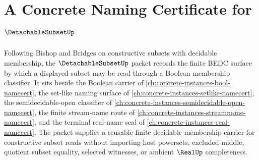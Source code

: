 \chapter{A Concrete Naming Certificate for $\DetachableSubsetUp$}
\label{ch:concrete-instances-detachable-subset-namecert}

Following Bishop and Bridges on constructive subsets with decidable membership, the $\DetachableSubsetUp$ packet records the finite BEDC surface by which a displayed subset may be read through a Boolean membership classifier. It sits beside the Boolean carrier of \autoref{ch:concrete-instances-bool-namecert}, the set-like naming surface of \autoref{ch:concrete-instances-setlike-namecert}, the semidecidable-open classifier of \autoref{ch:concrete-instances-semidecidable-open-namecert}, the finite stream-name route of \autoref{ch:concrete-instances-streamname-namecert}, and the terminal real-name seal of \autoref{ch:concrete-instances-real-namecert}. The packet supplies a reusable finite decidable-membership carrier for constructive subset reads without importing host powersets, excluded middle, quotient subset equality, selected witnesses, or ambient $\RealUp$ completeness.

